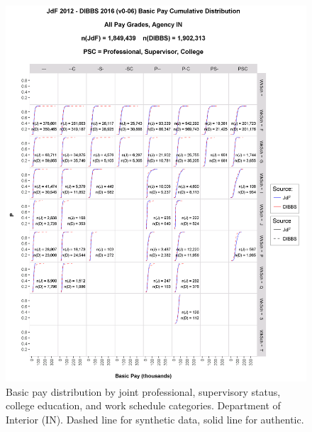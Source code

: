 \documentclass[10pt, letterpaper]{article}
\begin{document}
\begin{spacing}{1.0}
\begin{figure}[h]
    \centering
    \includegraphics[width=6.5in, trim={0 0 1in 1.5in}, clip]{JdFDIBBSBasicPayCDFIN.png}
    \caption{Basic pay distribution by joint professional, supervisory status, college education, and work schedule  categories.  Department of Interior (IN).  Dashed line for synthetic data, solid line for authentic.}
    \label{figure:JdFDIBBSBasicPayCDFIN}
\end{figure}

\clearpage


\end{spacing}
\end{document}
